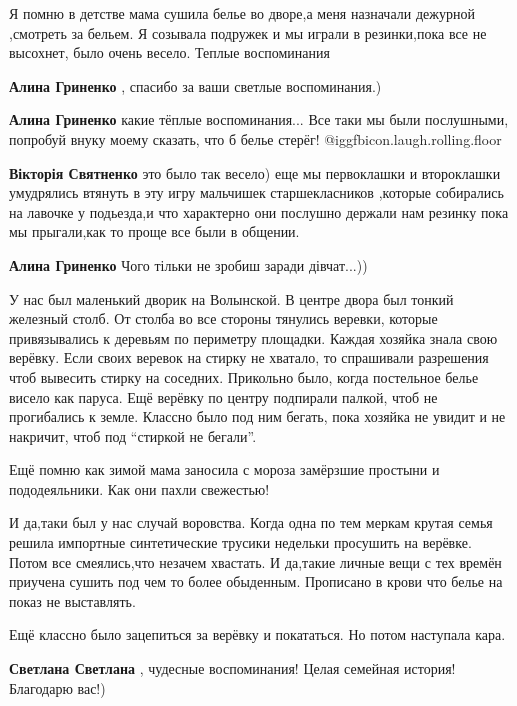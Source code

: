\begin{itemize}

Я помню в детстве мама сушила белье во дворе,а меня назначали дежурной
,смотреть за бельем. Я созывала подружек и мы играли в резинки,пока все не
высохнет, было очень весело. Теплые воспоминания

\begin{itemize} %
\textbf{Алина Гриненко} , спасибо за ваши светлые воспоминания.)

\textbf{Алина Гриненко} какие тёплые воспоминания... Все таки мы были послушными, попробуй внуку моему сказать, что б белье стерёг! @igg{fbicon.laugh.rolling.floor} 

\textbf{Вікторія Святненко} это было так весело) еще мы первоклашки и второклашки умудрялись втянуть в эту игру мальчишек старшекласников ,которые собирались на лавочке у подьезда,и что характерно они послушно держали нам резинку пока мы прыгали,как то проще все были в общении.

\textbf{Алина Гриненко} Чого тільки не зробиш заради дівчат...))
\end{itemize} %


У нас был маленький дворик на Волынской. В центре двора был тонкий железный
столб. От столба во все стороны тянулись веревки, которые привязывались к
деревьям по периметру площадки. Каждая хозяйка знала свою верёвку. Если своих
веревок на стирку не хватало, то спрашивали разрешения чтоб вывесить стирку на
соседних. Прикольно было, когда постельное белье висело как паруса. Ещё верёвку
по центру подпирали палкой, чтоб не прогибались к земле. Классно было под ним
бегать, пока хозяйка не увидит и не накричит, чтоб под \enquote{стиркой не бегали}.

Ещё помню как зимой мама заносила с мороза замёрзшие простыни и пододеяльники.
Как они пахли свежестью!

И да,таки был у нас случай воровства. Когда одна по тем меркам крутая семья
решила импортные синтетические трусики недельки просушить на верёвке. Потом все
смеялись,что незачем хвастать. И да,такие личные вещи с тех времён приучена
сушить под чем то более обыденным. Прописано в крови что белье на показ не
выставлять.

Ещё классно было зацепиться за верёвку и покататься. Но потом наступала кара.

\begin{itemize} %
\textbf{Светлана Светлана} , чудесные воспоминания! Целая семейная история! Благодарю вас!)


\end{itemize}
\end{itemize}
